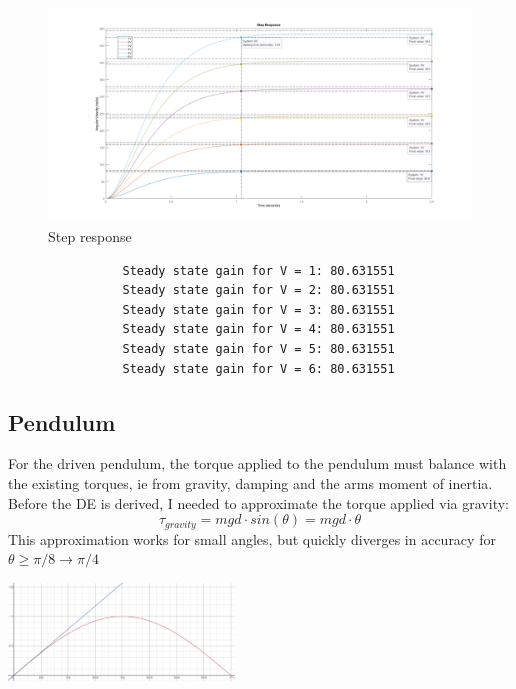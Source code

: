 \documentclass[a4paper,11pt]{article}
\begin{document}
\begin{figure}[h]
        \centering
        \includegraphics[width=\textwidth]{inc/motor_steps.png}
        \caption{Step response}
        \label{}
\end{figure}
\begin{center}
        \begin{verbatim}
                Steady state gain for V = 1: 80.631551
                Steady state gain for V = 2: 80.631551
                Steady state gain for V = 3: 80.631551
                Steady state gain for V = 4: 80.631551
                Steady state gain for V = 5: 80.631551
                Steady state gain for V = 6: 80.631551
        \end{verbatim}
\end{center}

\newpage
\subsection{Pendulum}
For the driven pendulum, the torque applied to the pendulum must balance with the existing torques, ie from gravity, damping and the arms moment of inertia.
Before the DE is derived, I needed to approximate the torque applied via gravity:
$$\tau_{gravity} = mgd{\cdot}sin(\theta) = mgd{\cdot}\theta$$
This approximation works for small angles, but quickly diverges in accuracy for $\theta \ge \pi/8 \rightarrow \pi/4$ \\

\begin{center}
        \includegraphics[width=0.45\textwidth]{inc/sintheta.png}
\end{center}
\end{document}
